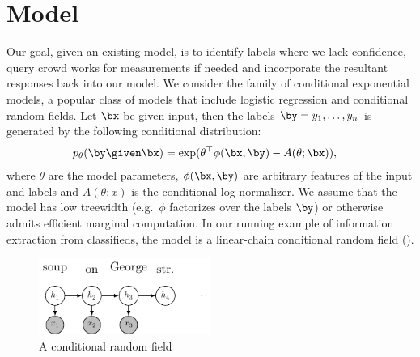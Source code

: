 \section{Model}
\label{sec:model}


Our goal, given an existing model, is to identify labels where we lack confidence, query crowd works for measurements if needed and incorporate the resultant responses back into our model.
We consider the family of conditional exponential models, a popular class of models that include logistic regression and conditional random fields.
Let $\bx$ be given input, then the labels $\by = y_1, \ldots, y_n$ is generated by the following conditional distribution:
\begin{align*}
  \p(\by \given \bx) 
  &= \exp( \theta^\top \phi(\bx, \by) - A(\theta; \bx)),
\end{align*}
where $\theta$ are the model parameters, $\phi(\bx, \by)$ are arbitrary features of the input and labels and $A(\theta; x)$ is the conditional log-normalizer.
We assume that the model has low treewidth (e.g.\ $\phi$ factorizes over the labels $\by$) or otherwise admits efficient marginal computation.
In our running example of information extraction from classifieds, the model is a linear-chain conditional random field ().

\begin{figure}[t]
  \begin{centering}
  \includegraphics[width=0.5\textwidth]{figures/simple-crf.pdf}
  \end{centering}
  \caption{A conditional random field }
  \label{fig:crf}
\end{figure}

